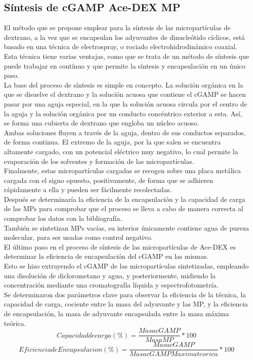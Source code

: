 \documentclass[a4paper,11pt]{article}
\begin{document}
\subsection{Síntesis de cGAMP Ace-DEX MP}
El método que se propone emplear para la síntesis de las micropartículas de dextrano, a la vez que se encapsulan los adyuvantes de dinucleótido cíclicos, está basado en una técnica de electrospray, o rociado electrohidrodinámico coaxial. Esta técnica tiene varias ventajas, como que se trata de un método de síntesis que puede trabajar en contínuo y que permite la síntesis y encapsulación en un único paso.
\\La base del proceso de síntesis es simple en concepto. La solución orgánica en la que se disuelve el dextrano y la solución acuosa que contiene el cGAMP se hacen pasar por una aguja especial, en la que la solución acuosa circula por el centro de la aguja y la solución orgánica por un conducto concéntrico exterior a esta. Así, se forma una cubierta de dextrano que engloba un núcleo acuoso.
\\Ambas soluciones fluyen a través de la aguja, dentro de sus conductos separados, de forma continua. El extremo de la aguja, por la que salen se encuentra altamente cargado, con un potencial eléctrico muy negativo, lo cual permite la evaporación de los solventes y formación de las micropartículas.
\\Finalmente, estas micropartículas cargadas se recogen sobre una placa metálica cargada con el signo opuesto, positivamente, de forma que se adhieren rápidamente a ella y pueden ser fácilmente recolectadas.
\\Después se determinaría la eficiencia de la encapsulación y la capacidad de carga de las MPs para comprobar que el proceso se lleva a cabo de manera correcta al comprobar los datos con la bibliografía. 
\\También se sintetizan MPs vacías, su interior únicamente contiene agua de pureza molecular, para ser usadas como control negativo.
\\El último paso en el proceso de síntesis de las micropartículas de Ace-DEX es determinar la eficiencia de encapsulación del cGAMP en las mismas.
\\Esto se hizo extrayendo el cGAMP de las micropartículas sintetizadas, empleando una disolución de diclorometano y agua, y posteriormente, midiendo la concentración mediante una cromatografía líquida y espectrofotometría.
\\Se determinaron dos parámetros clave para observar la eficiencia de la técnica, la capacidad de carga, cociente entre la masa del adyuvante y las MP, y la eficiencia de encapsulación, la masa de adyuvante encapsulada entre la masa máxima teórica.
\begin{displaymath}
	Capacidad de carga(\%) =  \frac{Masa cGAMP}{Masa MP} * 100
\end{displaymath}
\begin{displaymath}
	Eficiencia de Encapsulacion (\%) = \frac{Masa cGAMP}{Masa cGAMP Maxima  teorica} * 100
\end{displaymath}




	
\end{document}
